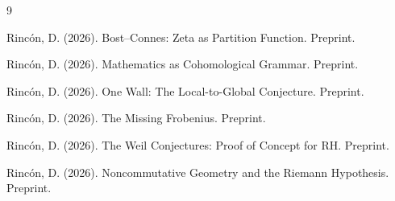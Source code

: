 \documentclass[12pt]{article}
\theoremstyle{definition}
\theoremstyle{remark}
\begin{document}
\begin{thebibliography}{9}

Rinc\'on, D. (2026).
Bost--Connes: Zeta as Partition Function. Preprint.

Rinc\'on, D. (2026).
Mathematics as Cohomological Grammar. Preprint.

Rinc\'on, D. (2026).
One Wall: The Local-to-Global Conjecture. Preprint.

Rinc\'on, D. (2026).
The Missing Frobenius. Preprint.

Rinc\'on, D. (2026).
The Weil Conjectures: Proof of Concept for RH. Preprint.

Rinc\'on, D. (2026).
Noncommutative Geometry and the Riemann Hypothesis. Preprint.

\end{thebibliography}
\end{document}
